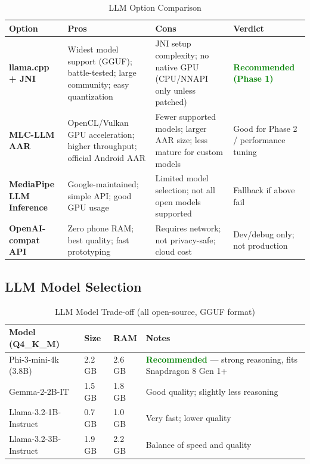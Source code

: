 \documentclass[11pt,a4paper]{article}
\begin{document}
\begin{table}[h!]
\centering
\renewcommand{\arraystretch}{1.3}
\begin{tabularx}{\textwidth}{L{2.6cm} L{3.8cm} L{3.8cm} L{3.8cm}}
\toprule
\textbf{Option} & \textbf{Pros} & \textbf{Cons} & \textbf{Verdict} \\
\midrule
\textbf{llama.cpp + JNI}
  & Widest model support (GGUF); battle-tested; large community; easy quantization
  & JNI setup complexity; no native GPU (CPU/NNAPI only unless patched)
  & \textcolor{green}{\textbf{Recommended (Phase 1)}} \\
\midrule
\textbf{MLC-LLM AAR}
  & OpenCL/Vulkan GPU acceleration; higher throughput; official Android AAR
  & Fewer supported models; larger AAR size; less mature for custom models
  & Good for Phase 2 / performance tuning \\
\midrule
\textbf{MediaPipe LLM Inference}
  & Google-maintained; simple API; good GPU usage
  & Limited model selection; not all open models supported
  & Fallback if above fail \\
\midrule
\textbf{OpenAI-compat API}
  & Zero phone RAM; best quality; fast prototyping
  & Requires network; not privacy-safe; cloud cost
  & Dev/debug only; not production \\
\bottomrule
\end{tabularx}
\caption{LLM Option Comparison}
\end{table}

\subsection{LLM Model Selection}

\begin{table}[h!]
\centering
\renewcommand{\arraystretch}{1.3}
\begin{tabularx}{\textwidth}{L{3cm} C{1.5cm} C{1.5cm} L{5.5cm}}
\toprule
\textbf{Model (Q4\_K\_M)} & \textbf{Size} & \textbf{RAM} & \textbf{Notes} \\
\midrule
Phi-3-mini-4k (3.8B) & 2.2\,GB & 2.6\,GB & \textcolor{green}{\textbf{Recommended}} — strong reasoning, fits Snapdragon 8 Gen 1+ \\
Gemma-2-2B-IT        & 1.5\,GB & 1.8\,GB & Good quality; slightly less reasoning \\
Llama-3.2-1B-Instruct & 0.7\,GB & 1.0\,GB & Very fast; lower quality \\
Llama-3.2-3B-Instruct & 1.9\,GB & 2.2\,GB & Balance of speed and quality \\
\bottomrule
\end{tabularx}
\caption{LLM Model Trade-off (all open-source, GGUF format)}
\end{table}
\end{document}
